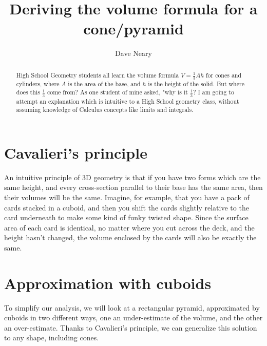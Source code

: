 \documentclass{article}
\title{Deriving the volume formula for a cone/pyramid}
\author{Dave Neary}
\begin{document}
\maketitle

\begin{abstract}
High School Geometry students all learn the volume formula $V=\frac{1}{3}Ah$ for cones
and cylinders, where $A$ is the area of the base, and $h$ is the height of the solid. But
where does this $\frac{1}{3}$ come from? As one student of mine asked, "why is it $\frac{1}{3}$?
I am going to attempt an explanation which is intuitive to a High School geometry class,
without assuming knowledge of Calculus concepts like limits and integrals.
\end{abstract}

\section*{Cavalieri's principle}

An intuitive principle of 3D geometry is that if you have two forms which are the same height,
and every cross-section parallel to their base has the same area, then their volumes will be
the same. Imagine, for example, that you have a pack of cards stacked in a cuboid, and then
you shift the cards slightly relative to the card underneath to make some kind of funky
twisted shape. Since the surface area of each card is identical, no matter where you cut
across the deck, and the height hasn't changed, the volume enclosed by the cards will also
be exactly the same.

\section*{Approximation with cuboids}

To simplify our analysis, we will look at a rectangular pyramid, approximated by cuboids in two
different ways, one an under-estimate of the volume, and the other an over-estimate.
Thanks to Cavalieri's principle, we can generalize this solution to any shape, including cones.

\begin{center}
\end{center}
\end{document}
